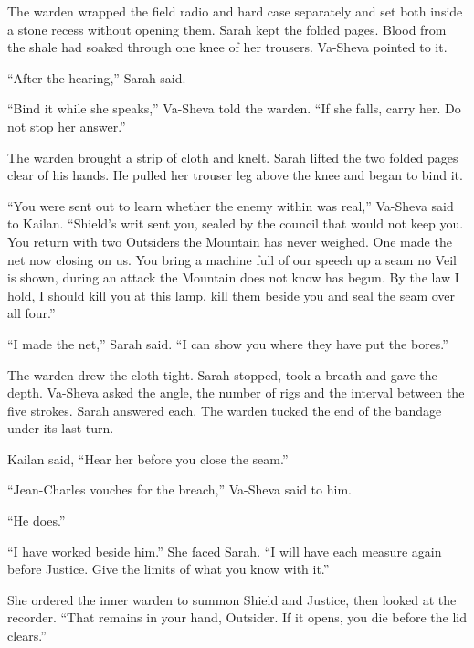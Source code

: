 The warden wrapped the field radio and hard case separately and set both inside a stone recess without opening them. Sarah kept the folded pages. Blood from the shale had soaked through one knee of her trousers. Va-Sheva pointed to it.\par

``After the hearing,'' Sarah said.\par

``Bind it while she speaks,'' Va-Sheva told the warden. ``If she falls, carry her. Do not stop her answer.''\par

The warden brought a strip of cloth and knelt. Sarah lifted the two folded pages clear of his hands. He pulled her trouser leg above the knee and began to bind it.\par

``You were sent out to learn whether the enemy within was real,'' Va-Sheva said to Kailan. ``Shield's writ sent you, sealed by the council that would not keep you. You return with two Outsiders the Mountain has never weighed. One made the net now closing on us. You bring a machine full of our speech up a seam no Veil is shown, during an attack the Mountain does not know has begun. By the law I hold, I should kill you at this lamp, kill them beside you and seal the seam over all four.''\par

``I made the net,'' Sarah said. ``I can show you where they have put the bores.''\par

The warden drew the cloth tight. Sarah stopped, took a breath and gave the depth. Va-Sheva asked the angle, the number of rigs and the interval between the five strokes. Sarah answered each. The warden tucked the end of the bandage under its last turn.\par

Kailan said, ``Hear her before you close the seam.''\par

``Jean-Charles vouches for the breach,'' Va-Sheva said to him.\par

``He does.''\par

``I have worked beside him.'' She faced Sarah. ``I will have each measure again before Justice. Give the limits of what you know with it.''\par

She ordered the inner warden to summon Shield and Justice, then looked at the recorder. ``That remains in your hand, Outsider. If it opens, you die before the lid clears.''\par

